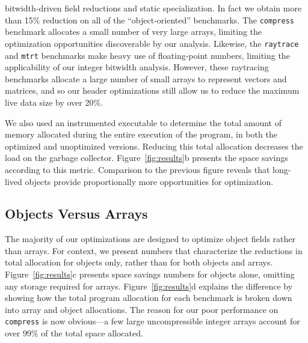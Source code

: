 \documentclass{sig-alt-full}
\begin{document}
bitwidth-driven field reductions and static specialization.  In fact
we obtain more than 15\% reduction on all of the ``object-oriented''
benchmarks.  The {\tt compress} benchmark allocates a small
number of very large arrays, limiting the optimization opportunities
discoverable by our analysis.  Likewise, the {\tt raytrace} and
{\tt mtrt} benchmarks make heavy use of floating-point numbers,
limiting the applicability of our integer bitwidth analysis.
However, these raytracing benchmarks allocate a large number
of small arrays to represent vectors and matrices, and so our header
optimizations still allow us to reduce the maximum live data size by
over 20\%.

We also used an instrumented executable to determine the total amount
of memory allocated during the entire execution of the program, in
both the optimized and unoptimized versions.  Reducing this total
allocation decreases the load on the garbage collector.
Figure~\ref{fig:results}b presents the space savings according to this
metric.  Comparison to the previous figure reveals that
long-lived objects provide proportionally more opportunities for
optimization.
%
\subsection{Objects Versus Arrays}
%
The majority of our optimizations are designed to optimize
object fields rather than arrays. For context, we present numbers 
that characterize the reductions in total allocation for objects only,
rather than for both objects and arrays. Figure~\ref{fig:results}c
presents space savings numbers for objects alone, omitting
any storage required for arrays.
Figure~\ref{fig:results}d explains the difference by showing how the total
program allocation for each benchmark is broken down into array and
object allocations.
The reason for our poor performance on {\tt compress} is now
  obvious---a few large uncompressible integer arrays
  account for over 99\% of the total space allocated.
%
\end{document}
